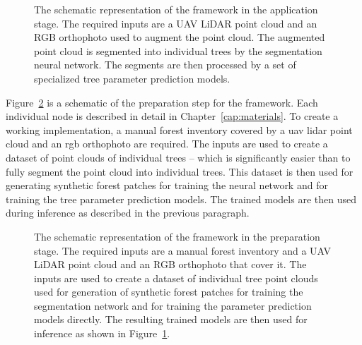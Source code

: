 \begin{figure}
\caption[Schematic representation of the framework: application]{\label{fig-framework-apply}The schematic representation of the
framework in the application stage.
The required inputs are a UAV LiDAR point cloud and an RGB orthophoto used to augment the point cloud.
The augmented point cloud is segmented into individual trees by the segmentation neural network.
The segments are then processed by a set of specialized tree parameter prediction models.}
\end{figure}

Figure~\ref{fig-framework-prepare} is a schematic of the preparation step for the framework.
Each individual node is described in detail in Chapter~\ref{cap:materials}.
To create a working implementation, a manual forest inventory covered by a \gls{uav} \gls{lidar} point cloud and an \gls{rgb} orthophoto are required.
The inputs are used to create a dataset of point clouds of individual trees – which is significantly easier than to fully segment the point cloud into individual trees.
This dataset is then used for generating synthetic forest patches for training the neural network and for training the tree parameter prediction models.
The trained models are then used during inference as described in the previous paragraph.

\begin{figure}
\caption[Schematic representation of the framework: preparation]{\label{fig-framework-prepare}The schematic representation of
the framework in the preparation stage.
The required inputs are a manual forest inventory and a UAV LiDAR point cloud and an RGB orthophoto that cover it.
The inputs are used to create a dataset of individual tree point clouds used for generation of synthetic forest patches for training the segmentation network and for training the parameter prediction models directly.
The resulting trained models are then used for inference as shown in Figure~\ref{fig-framework-apply}.}
\end{figure}

